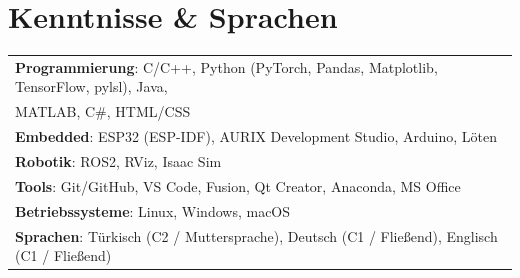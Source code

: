 \documentclass[a4paper,11pt]{article}
\begin{document}
\section{Kenntnisse \& Sprachen}
\small
\begin{tabular*}{\textwidth}{@{\extracolsep{\fill}} l}
\textbf{Programmierung}: C/C++, Python (PyTorch, Pandas, Matplotlib, TensorFlow, pylsl), Java,\\ MATLAB, C\#, HTML/CSS \\
\vspace{0.1cm}
\textbf{Embedded}: ESP32 (ESP-IDF), AURIX Development Studio, Arduino, Löten \\
\vspace{0.1cm}
\textbf{Robotik}: ROS2, RViz, Isaac Sim \\
\vspace{0.1cm}
\textbf{Tools}: Git/GitHub, VS Code, Fusion, Qt Creator, Anaconda, MS Office \\
\vspace{0.1cm}
\textbf{Betriebssysteme}: Linux, Windows, macOS \\
\vspace{0.1cm}
\textbf{Sprachen}: Türkisch (C2 / Muttersprache), Deutsch (C1 / Fließend), Englisch (C1 / Fließend)
\end{tabular*}
\end{document}
